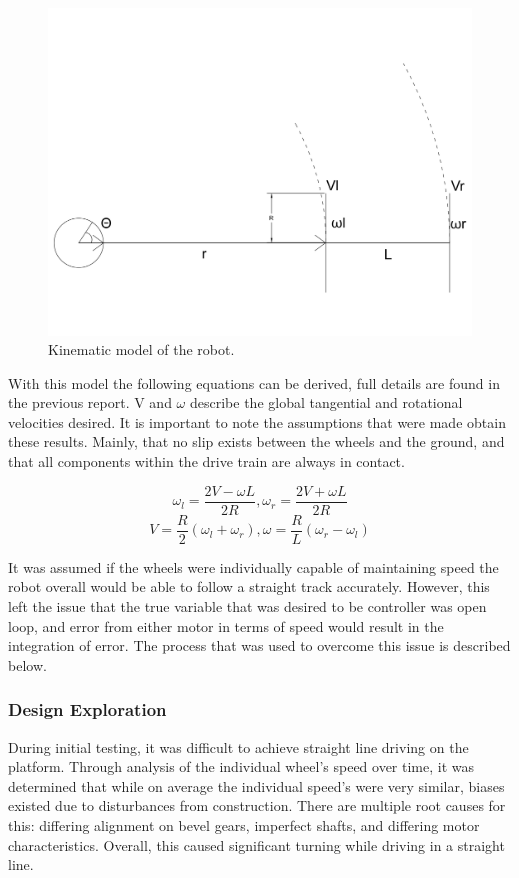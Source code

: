\documentclass[ece]{uw-wkrpt}
\begin{document}
\begin{figure}
    \centering
    \includegraphics[width=5.5in]{res/diagram}
    \caption[Kinematic model of the robot]
          {Kinematic model of the robot.}
    \label{fig:kinematicModel}
\end{figure}

With this model the following equations can be derived, full details are found in the previous report. V and $\omega$ describe the global tangential and rotational velocities desired. It is important to note the assumptions that were made obtain these results. Mainly, that no slip exists between the wheels and the ground, and that all components within the drive train are always in contact.

\[\omega_l = \frac{2V-\omega L}{2R},\omega_r = \frac{2V+\omega L}{2R}\]
\[V=\frac{R}{2}(\omega_l+\omega_r),  \omega=\frac{R}{L}(\omega_r-\omega_l)\]

It was assumed if the wheels were individually capable of maintaining speed the robot overall would be able to follow a straight track accurately. However, this left the issue that the true variable that was desired to be controller was open loop, and error from either motor in terms of speed would result in the integration of error. The process that was used to overcome this issue is described below.

\subsubsection{Design Exploration}

During initial testing, it was difficult to achieve straight line driving on the platform. Through analysis of the individual wheel's speed over time, it was determined that while on average the individual speed's were very similar, biases existed due to disturbances from construction. There are multiple root causes for this: differing alignment on bevel gears, imperfect shafts, and differing motor characteristics. Overall, this caused significant turning while driving in a straight line.
\end{document}
